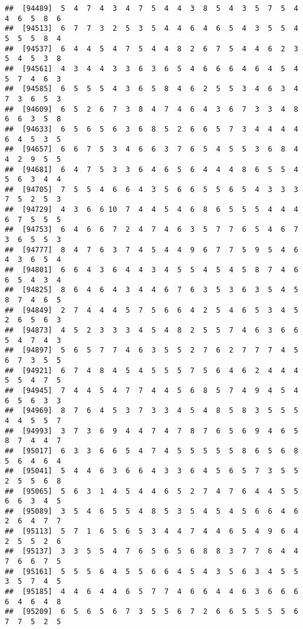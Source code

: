 \documentclass[
]{book}
\begin{document}
\begin{verbatim}
##  [94489]  5  4  7  4  3  4  7  5  4  4  3  8  5  4  3  5  7  5  4  4  6  5  8  6
##  [94513]  6  7  7  3  2  5  3  5  4  4  6  4  6  5  4  3  5  5  4  5  5  5  8  4
##  [94537]  6  4  4  5  4  7  5  4  4  8  2  6  7  5  4  4  6  2  3  5  4  5  3  8
##  [94561]  4  3  4  4  3  3  6  3  6  5  4  6  6  6  4  6  4  5  4  5  7  4  6  3
##  [94585]  6  5  5  5  4  3  6  5  8  4  6  2  5  5  3  4  6  3  4  7  3  6  5  3
##  [94609]  6  5  2  6  7  3  8  4  7  4  6  4  3  6  7  3  3  4  8  6  6  3  5  8
##  [94633]  6  5  6  5  6  3  6  8  5  2  6  6  5  7  3  4  4  4  4  6  4  5  3  5
##  [94657]  6  6  7  5  3  4  6  6  3  7  6  5  4  5  5  3  6  8  4  4  2  9  5  5
##  [94681]  6  4  7  5  3  3  6  4  6  5  6  4  4  4  8  6  5  5  4  5  6  3  4  4
##  [94705]  7  5  5  4  6  6  4  3  5  6  6  5  5  6  5  4  3  3  3  7  5  2  5  3
##  [94729]  4  3  6  6 10  7  4  4  5  4  6  8  6  5  5  5  4  4  4  6  7  5  5  5
##  [94753]  6  4  6  6  7  2  4  7  4  6  3  5  7  7  6  5  4  6  7  3  6  5  5  3
##  [94777]  8  4  7  6  3  7  4  5  4  4  9  6  7  7  5  9  5  4  6  4  3  6  5  4
##  [94801]  6  6  4  3  6  4  4  3  4  5  5  4  5  4  5  8  7  4  6  6  5  4  3  4
##  [94825]  8  6  4  6  4  3  4  4  6  7  6  3  5  3  6  3  5  4  5  8  7  4  6  5
##  [94849]  2  7  4  4  4  5  7  5  6  6  4  2  5  4  6  5  3  4  5  2  6  5  6  3
##  [94873]  4  5  2  3  3  3  4  5  4  8  2  5  5  7  4  6  3  6  6  5  4  7  4  3
##  [94897]  5  6  5  7  7  4  6  3  5  5  2  7  6  2  7  7  7  4  5  6  7  3  5  5
##  [94921]  6  7  4  8  4  5  4  5  5  5  7  5  6  4  6  2  4  4  4  5  5  4  7  5
##  [94945]  7  4  4  5  4  7  7  4  4  5  6  8  5  7  4  9  4  5  4  6  5  6  3  3
##  [94969]  8  7  6  4  5  3  7  3  3  4  5  4  8  5  8  3  5  5  5  4  4  5  5  7
##  [94993]  3  7  3  6  9  4  4  7  4  7  8  7  6  5  6  9  4  6  5  8  7  4  4  7
##  [95017]  6  3  3  6  6  5  4  7  4  5  5  5  5  5  8  6  5  6  8  5  6  4  6  4
##  [95041]  5  4  4  6  3  6  6  4  3  3  6  4  5  6  5  7  3  5  5  2  5  5  6  8
##  [95065]  5  6  3  1  4  5  4  4  6  5  2  7  4  7  6  4  4  5  5  6  6  3  4  5
##  [95089]  3  5  4  6  5  5  4  8  5  3  5  4  5  4  5  6  6  4  6  2  6  4  7  7
##  [95113]  5  7  1  6  5  6  5  3  4  4  7  4  4  6  5  4  9  6  4  2  5  5  2  6
##  [95137]  3  3  5  5  4  7  6  5  6  5  6  8  8  3  7  7  6  4  4  7  6  6  7  5
##  [95161]  5  5  5  6  4  5  5  6  6  4  5  4  3  5  6  3  4  5  5  3  5  7  4  5
##  [95185]  4  4  6  4  4  6  5  7  7  4  6  6  4  4  6  3  6  6  6  6  4  6  4  8
##  [95209]  6  5  6  5  6  7  3  5  5  6  7  2  6  6  5  5  5  5  6  7  7  5  2  5

\end{verbatim}
\end{document}
